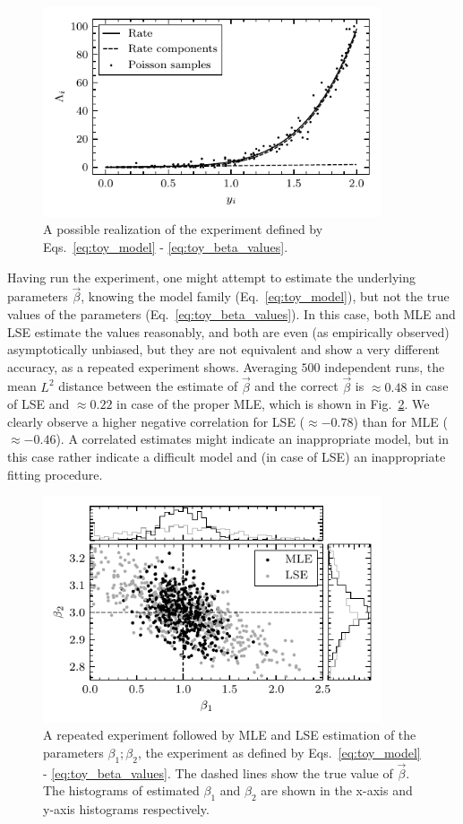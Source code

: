 \begin{figure}[h]
 	\centering
 	\includegraphics[width=10cm]{figures/toy_model_curve.pdf}
 	\caption{A possible realization of the experiment defined by Eqs.~\ref{eq:toy_model} - \ref{eq:toy_beta_values}.}
 	\label{fig:toy_model_curve}
\end{figure}

Having run the experiment, one might attempt to estimate the underlying parameters $\vec{\beta}$, knowing the model family (Eq.~\ref{eq:toy_model}), but not the true values of the parameters (Eq.~\ref{eq:toy_beta_values}). In this case, both MLE and LSE estimate the values reasonably, and both are even (as empirically observed) asymptotically unbiased, but they are not equivalent and show a very different accuracy, as a repeated experiment shows. Averaging $500$ independent runs, the mean $L^2$ distance between the estimate of $\vec{\beta}$ and the correct $\vec{\beta}$ is $\approx 0.48$ in case of LSE and $\approx 0.22$ in case of the proper MLE, which is shown in Fig.~\ref{fig:toy_model_draws}. We clearly observe a higher negative correlation for LSE ($\approx -0.78 $) than for MLE ($\approx -0.46 $). A correlated estimates might indicate an inappropriate model, but in this case rather indicate a difficult model and (in case of LSE) an inappropriate fitting procedure.

\begin{figure}[h]
 	\centering
 	\includegraphics[width=10cm]{figures/toy_model_draws.pdf}
 	\caption{A repeated experiment followed by MLE and LSE estimation of the parameters $\beta_1; \beta_2$, the experiment as defined by Eqs.~\ref{eq:toy_model} - \ref{eq:toy_beta_values}. The dashed lines show the true value of $\vec{\beta}$. The histograms of estimated $\beta_1$ and $\beta_2$ are shown in the x-axis and y-axis histograms respectively.}
 	\label{fig:toy_model_draws}
\end{figure}

